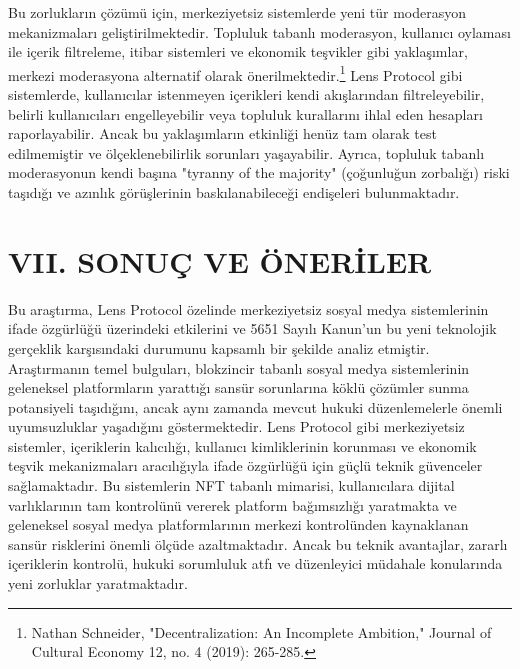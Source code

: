 \documentclass[11pt,a4paper]{article}
\begin{document}
Bu zorlukların çözümü için, merkeziyetsiz sistemlerde yeni tür moderasyon mekanizmaları geliştirilmektedir. Topluluk tabanlı moderasyon, kullanıcı oylaması ile içerik filtreleme, itibar sistemleri ve ekonomik teşvikler gibi yaklaşımlar, merkezi moderasyona alternatif olarak önerilmektedir.\footnote{Nathan Schneider, "Decentralization: An Incomplete Ambition," Journal of Cultural Economy 12, no. 4 (2019): 265-285.} Lens Protocol gibi sistemlerde, kullanıcılar istenmeyen içerikleri kendi akışlarından filtreleyebilir, belirli kullanıcıları engelleyebilir veya topluluk kurallarını ihlal eden hesapları raporlayabilir. Ancak bu yaklaşımların etkinliği henüz tam olarak test edilmemiştir ve ölçeklenebilirlik sorunları yaşayabilir. Ayrıca, topluluk tabanlı moderasyonun kendi başına "tyranny of the majority" (çoğunluğun zorbalığı) riski taşıdığı ve azınlık görüşlerinin baskılanabileceği endişeleri bulunmaktadır.

\section*{\fontsize{12}{14}\selectfont\bfseries VII. SONUÇ VE ÖNERİLER}

Bu araştırma, Lens Protocol özelinde merkeziyetsiz sosyal medya sistemlerinin ifade özgürlüğü üzerindeki etkilerini ve 5651 Sayılı Kanun'un bu yeni teknolojik gerçeklik karşısındaki durumunu kapsamlı bir şekilde analiz etmiştir. Araştırmanın temel bulguları, blokzincir tabanlı sosyal medya sistemlerinin geleneksel platformların yarattığı sansür sorunlarına köklü çözümler sunma potansiyeli taşıdığını, ancak aynı zamanda mevcut hukuki düzenlemelerle önemli uyumsuzluklar yaşadığını göstermektedir. Lens Protocol gibi merkeziyetsiz sistemler, içeriklerin kalıcılığı, kullanıcı kimliklerinin korunması ve ekonomik teşvik mekanizmaları aracılığıyla ifade özgürlüğü için güçlü teknik güvenceler sağlamaktadır. Bu sistemlerin NFT tabanlı mimarisi, kullanıcılara dijital varlıklarının tam kontrolünü vererek platform bağımsızlığı yaratmakta ve geleneksel sosyal medya platformlarının merkezi kontrolünden kaynaklanan sansür risklerini önemli ölçüde azaltmaktadır. Ancak bu teknik avantajlar, zararlı içeriklerin kontrolü, hukuki sorumluluk atfı ve düzenleyici müdahale konularında yeni zorluklar yaratmaktadır.
\end{document}
